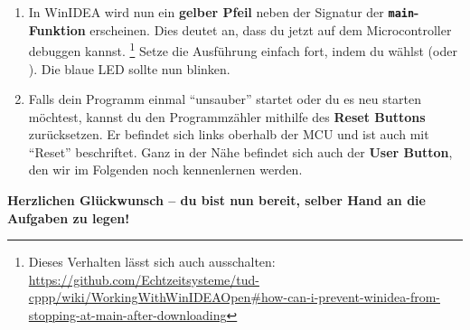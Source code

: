 \begin{enumerate}
\item 
In WinIDEA wird nun ein \textbf{gelber Pfeil} neben der Signatur der \textbf{\lstinline|main|-Funktion} erscheinen.
Dies deutet an, dass du jetzt auf dem Microcontroller debuggen kannst.
\footnote{Dieses Verhalten lässt sich auch ausschalten: \url{https://github.com/Echtzeitsysteme/tud-cppp/wiki/WorkingWithWinIDEAOpen\#how-can-i-prevent-winidea-from-stopping-at-main-after-downloading}}
Setze die Ausführung einfach fort, indem du \textbf{} wählst (oder ).
Die blaue LED sollte nun blinken.

\item 
Falls dein Programm einmal \enquote{unsauber} startet oder du es neu starten möchtest, kannst du den Programmzähler mithilfe des \textbf{Reset Buttons} zurücksetzen.
Er befindet sich links oberhalb der MCU und ist auch mit \enquote{Reset} beschriftet.
Ganz in der Nähe befindet sich auch der \textbf{User Button}, den wir im Folgenden noch kennenlernen werden.
\end{enumerate}

\noindent\textbf{Herzlichen Glückwunsch -- du bist nun bereit, selber Hand an die Aufgaben zu legen!}

